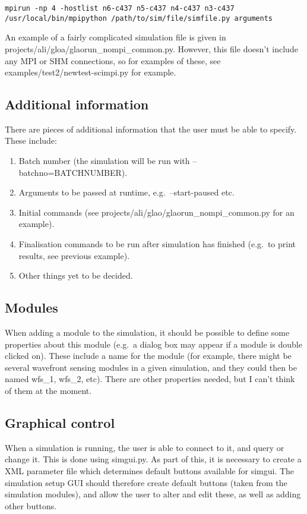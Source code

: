 \documentclass{article}
\begin{document}
\texttt{mpirun -np 4 -hostlist n6-c437 n5-c437 n4-c437 n3-c437
  /usr/local/bin/mpipython /path/to/sim/file/simfile.py arguments}

An example of a fairly complicated simulation file is given in
projects/ali/gloa/glaorun\_nompi\_common.py.  However, this file
doesn't include any MPI or SHM connections, so for examples of these,
see examples/test2/newtest-scimpi.py for example.

\subsection{Additional information}
There are pieces of additional information that the user must be able
to specify.  These include:
\begin{enumerate}
\item Batch number (the simulation will be run with
  --batchno=BATCHNUMBER).
\item Arguments to be passed at runtime, e.g.\ --start-paused etc.
\item Initial commands (see projects/ali/glao/glaorun\_nompi\_common.py
  for an example).
\item Finalisation commands to be run after simulation has finished
  (e.g.\ to print results, see previous example).
\item Other things yet to be decided.
\end{enumerate}


\subsection{Modules}
When adding a module to the simulation, it should be possible to
define some properties about this module (e.g.\ a dialog box may
appear if a module is double clicked on).  These include a name
for the module (for example, there might be several wavefront sensing
modules in a given simulation, and they could then be named wfs\_1,
wfs\_2, etc).  There are other properties needed, but I can't
think of them at the moment.  

\subsection{Graphical control}
When a simulation is running, the user is able to connect to it, and
query or change it.  This is done using simgui.py.  As part of this,
it is necessary to create a XML parameter file which determines
default buttons available for simgui.  The simulation setup GUI should
therefore create default buttons (taken from the simulation modules),
and allow the user to alter and edit these, as well as adding other buttons.


\pagebreak


\printindex
\end{document}
